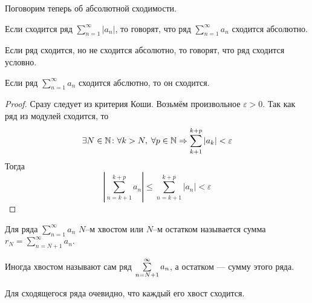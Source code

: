 \documentclass[a4paper, 12pt]{article}
\begin{document}
Поговорим теперь об абсолютной сходимости.
\begin{Def}
	Если сходится ряд $\sum\limits_{n = 1}^{\infty}|a_n|$, то говорят, что ряд $\sum\limits_{n = 1}^{\infty}a_n$ сходится абсолютно.
\end{Def}
\begin{Def}
	Если ряд сходится, но не сходится абсолютно, то говорят, что ряд сходится условно.
\end{Def}
\begin{Statement}
	Если ряд $\sum\limits_{n=1}^{\infty}a_n$ сходится абслютно, то он сходится.
\end{Statement}
\begin{proof}
	Сразу следует из критерия Коши. Возьмём произвольное $\varepsilon>0$. Так как ряд из модулей сходится, то $$\exists N\in \mathbb{N}\colon \forall k>N,\; \forall p\in \mathbb{N} \Rightarrow \sum\limits_{k+1}^{k+p}|a_k| < \varepsilon$$
	Тогда $$\left| \sum\limits_{n=k+1}^{k+p}a_n\right| \leqslant \sum\limits_{n=k+1}^{k+p}|a_n| < \varepsilon$$
\end{proof}

\begin{Def}
	Для ряда $\sum \limits_{n=1}^{\infty}a_n$ $N$--м хвостом или $N$--м остатком называется сумма \\
	$
	r_N = \sum \limits_{n=N+1}^{\infty}a_n.
	$
\end{Def}

Иногда хвостом называют сам ряд $\sum\limits_{n=N+1}^{\infty} a_n$, а остатком --- сумму этого ряда.

Для сходящегося ряда очевидно, что каждый его хвост сходится.
\end{document}
